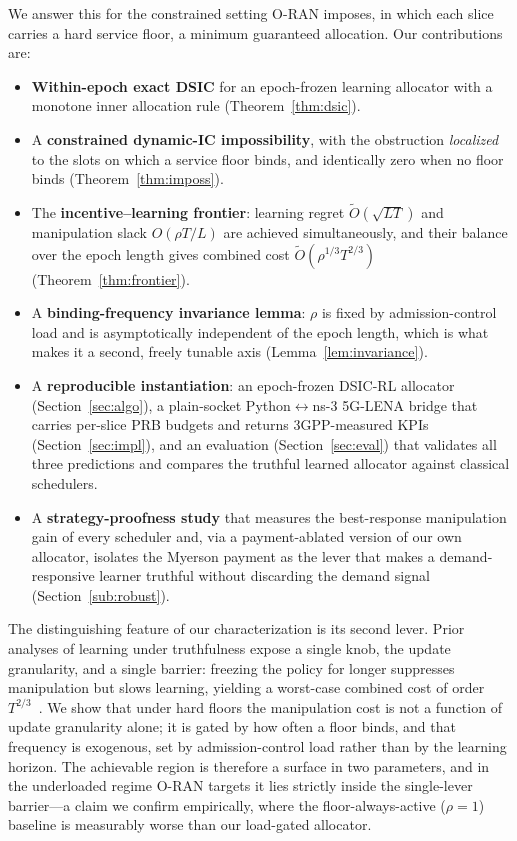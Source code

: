 \documentclass[conference]{IEEEtran}
\theoremstyle{definition}
\theoremstyle{remark}
\newcommand{\Slots}{T}
\newcommand{\Ep}{L}
\newcommand{\rhobind}{\rho}
\newcommand{\Otil}{\tilde{O}}
\begin{document}
We answer this for the constrained setting O-RAN imposes, in which each slice carries a hard service floor, a minimum guaranteed allocation. Our contributions are:
\begin{itemize}
\item \textbf{Within-epoch exact DSIC} for an epoch-frozen learning allocator with a monotone inner allocation rule (Theorem~\ref{thm:dsic}).
\item A \textbf{constrained dynamic-IC impossibility}, with the obstruction \emph{localized} to the slots on which a service floor binds, and identically zero when no floor binds (Theorem~\ref{thm:imposs}).
\item The \textbf{incentive--learning frontier}: learning regret $\Otil(\sqrt{\Ep\Slots})$ and manipulation slack $O(\rhobind\Slots/\Ep)$ are achieved simultaneously, and their balance over the epoch length gives combined cost $\Otil(\rhobind^{1/3}\Slots^{2/3})$ (Theorem~\ref{thm:frontier}).
\item A \textbf{binding-frequency invariance lemma}: $\rhobind$ is fixed by admission-control load and is asymptotically independent of the epoch length, which is what makes it a second, freely tunable axis (Lemma~\ref{lem:invariance}).
\item A \textbf{reproducible instantiation}: an epoch-frozen DSIC-RL allocator (Section~\ref{sec:algo}), a plain-socket Python$\leftrightarrow$ns-3 5G-LENA bridge that carries per-slice PRB budgets and returns 3GPP-measured KPIs (Section~\ref{sec:impl}), and an evaluation (Section~\ref{sec:eval}) that validates all three predictions and compares the truthful learned allocator against classical schedulers.
\item A \textbf{strategy-proofness study} that measures the best-response manipulation gain of every scheduler and, via a payment-ablated version of our own allocator, isolates the Myerson payment as the lever that makes a demand-responsive learner truthful without discarding the demand signal (Section~\ref{sub:robust}).
\end{itemize}

The distinguishing feature of our characterization is its second lever. Prior analyses of learning under truthfulness expose a single knob, the update granularity, and a single barrier: freezing the policy for longer suppresses manipulation but slows learning, yielding a worst-case combined cost of order $\Slots^{2/3}$~\cite{ref:dai,ref:dekel}. We show that under hard floors the manipulation cost is not a function of update granularity alone; it is gated by how often a floor binds, and that frequency is exogenous, set by admission-control load rather than by the learning horizon. The achievable region is therefore a surface in two parameters, and in the underloaded regime O-RAN targets it lies strictly inside the single-lever barrier---a claim we confirm empirically, where the floor-always-active ($\rhobind\!=\!1$) baseline is measurably worse than our load-gated allocator.
\end{document}
